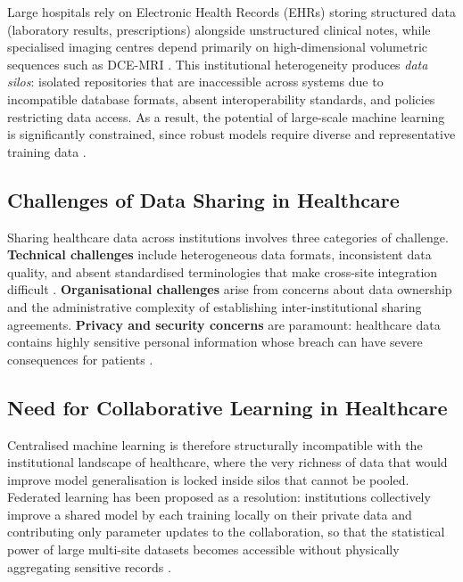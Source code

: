 Large hospitals rely on Electronic Health Records (EHRs) storing structured data
(laboratory results, prescriptions) alongside unstructured clinical notes, while
specialised imaging centres depend primarily on high-dimensional volumetric sequences
such as DCE-MRI \cite{jensen2012mining}.
This institutional heterogeneity produces \textit{data silos}: isolated repositories
that are inaccessible across systems due to incompatible database formats, absent
interoperability standards, and policies restricting data access.
As a result, the potential of large-scale machine learning is significantly constrained,
since robust models require diverse and representative training data \cite{Peeyush2025healthcare}.

\subsection{Challenges of Data Sharing in Healthcare}

Sharing healthcare data across institutions involves three categories of challenge.
\textbf{Technical challenges} include heterogeneous data formats, inconsistent data
quality, and absent standardised terminologies that make cross-site integration
difficult \cite{kahn2016transparent}.
\textbf{Organisational challenges} arise from concerns about data ownership and
the administrative complexity of establishing inter-institutional sharing agreements.
\textbf{Privacy and security concerns} are paramount: healthcare data contains
highly sensitive personal information whose breach can have severe consequences
for patients \cite{olivia2026secure}.

\subsection{Need for Collaborative Learning in Healthcare}

Centralised machine learning is therefore structurally incompatible with
the institutional landscape of healthcare, where the very richness of
data that would improve model generalisation is locked inside silos that
cannot be pooled.
Federated learning has been proposed as a resolution: institutions
collectively improve a shared model by each training locally on their
private data and contributing only parameter updates to the collaboration,
so that the statistical power of large multi-site datasets becomes
accessible without physically aggregating sensitive records
\cite{kairouz2021advances,rieke2020future}.

